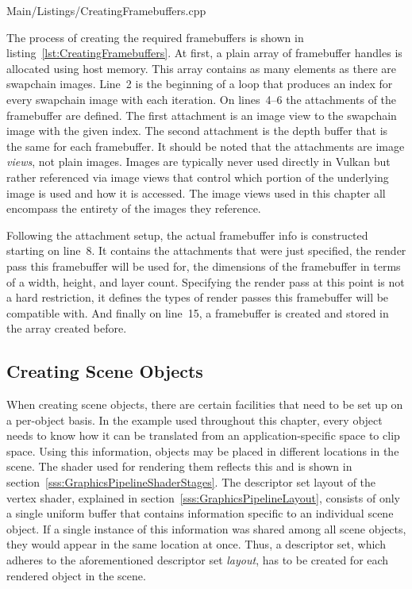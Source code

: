      
      {Main/Listings/CreatingFramebuffers.cpp}

      The process of creating the required framebuffers is shown in listing~\ref{lst:CreatingFramebuffers}.
      At first, a plain array of framebuffer handles is allocated using host memory.
      This array contains as many elements as there are swapchain images.
      Line~2 is the beginning of a loop that produces an index for every swapchain image with each iteration.
      On lines~4--6 the attachments of the framebuffer are defined.
      The first attachment is an image view to the swapchain image with the given index.
      The second attachment is the depth buffer that is the same for each framebuffer.
      It should be noted that the attachments are image \textit{views}, not plain images.
      Images are typically never used directly in Vulkan but rather referenced via image views that control which portion of the underlying image is used and how it is accessed.
      The image views used in this chapter all encompass the entirety of the images they reference.

      Following the attachment setup, the actual framebuffer info is constructed starting on line~8.
      It contains the attachments that were just specified, the render pass this framebuffer will be used for, the dimensions of the framebuffer in terms of a width, height, and layer count.
      Specifying the render pass at this point is not a hard restriction, it defines the types of render passes this framebuffer will be compatible with.
      And finally on line~15, a framebuffer is created and stored in the array created before.

    \subsection{Creating Scene Objects}
    \label{sss:CreatingSceneObjects}

      When creating scene objects, there are certain facilities that need to be set up on a per-object basis.
      In the example used throughout this chapter, every object needs to know how it can be translated from an application-specific space to clip space.
      Using this information, objects may be placed in different locations in the scene.
      The shader used for rendering them reflects this and is shown in section~\ref{sss:GraphicsPipelineShaderStages}.
      The descriptor set layout of the vertex shader, explained in section~\ref{sss:GraphicsPipelineLayout}, consists of only a single uniform buffer that contains information specific to an individual scene object.
      If a single instance of this information was shared among all scene objects, they would appear in the same location at once.
      Thus, a descriptor set, which adheres to the aforementioned descriptor set \textit{layout}, has to be created for each rendered object in the scene.

